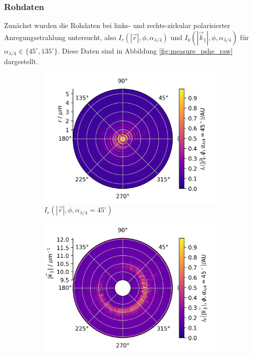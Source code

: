\documentclass[titlepage,  ngerman]{article}
\begin{document}
	\subsubsection{Rohdaten}
	Zunächst wurden die Rohdaten bei links- und rechts-zirkular polarisierter Anregungsstrahlung untersucht, also $I_r(|\vec{r}|, \phi, \alpha_{\lambda /4})$ und $I_k(|\vec{k}_\parallel|, \phi, \alpha_{\lambda /4})$ für $\alpha_{\lambda /4} \in \{45^\circ, 135^\circ\}$. Diese Daten sind in Abbildung \ref{fig:measure_pshe_raw} dargestellt. 
	\begin{figure}[h]
		\begin{subfigure}{0.49\textwidth}
			\centering
			\includegraphics[width=\textwidth]{figures/new/4_3_fp_45.png}
			\caption{$I_r(|\vec{r}|, \phi, \alpha_{\lambda /4} = 45^\circ)$}
			\label{fig:raw_fp_45}
		\end{subfigure}
		\begin{subfigure}{0.5\textwidth}
			\centering
			\includegraphics[width=\textwidth]{figures/new/4_3_bfp_45.png}

\end{subfigure}
\end{figure}
\end{document}
